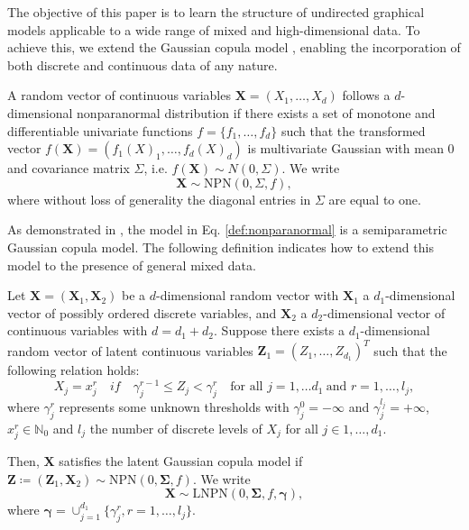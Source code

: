 The objective of this paper is to learn the structure of undirected graphical models applicable to a wide range of mixed and high-dimensional data. To achieve this, we extend the Gaussian copula model \citep{Liu09, Liu12, Xue12}, enabling the incorporation of both discrete and continuous data of any nature.

\begin{definition}
    A random vector of continuous variables \(\mathbf{X} = (X_1, \dots, X_d)\) follows a $d$-dimensional nonparanormal distribution if there exists a set of monotone and differentiable univariate functions $f = \{f_1,\dots, f_d\}$ such that the transformed vector \(f(\mathbf{X}) = (f_1(X)_1, \dots, f_d(X)_d)\) is multivariate Gaussian with mean $0$ and covariance matrix \(\Sigma\), i.e. \(f(\mathbf{X})\sim N(0,\Sigma)\). We write
    \begin{equation}\label{def:nonparanormal}
        \mathbf{X} \sim \text{NPN}(0, \Sigma, f),
    \end{equation}
    where without loss of generality the diagonal entries in \(\Sigma\) are equal to one.
\end{definition}

As demonstrated in \cite{Liu09}, the model in Eq. \eqref{def:nonparanormal} is a semiparametric Gaussian copula model. The following definition indicates how to extend this model to the presence of general mixed data.

\begin{definition}\label{latent_gaussian_cm}
    Let $\mathbf{X} = (\mathbf{X}_1,\mathbf{X}_2)$ be a $d$-dimensional random vector with \(\mathbf{X}_1\) a $d_1$-dimensional vector of possibly ordered discrete variables, and \(\mathbf{X}_2\) a $d_2$-dimensional vector of continuous variables with \(d = d_1 + d_2\). Suppose there exists a $d_1$-dimensional random vector of latent continuous variables $\mathbf{Z}_1 = (Z_1, \dots, Z_{d_1})^T$ such that the following relation holds:
    \begin{equation}\label{latent_ordered}
        X_j = x_j^{r} \quad if \quad \gamma_j^{r-1} \leq Z_j < \gamma_j^r \quad \text{for all } j = 1, \dots d_1 \ \text{and } r = 1, \dots, l_j,
    \end{equation}
    where $\gamma^r_j$ represents some unknown thresholds with $\gamma_j^0 = -\infty$ and $\gamma_j^{l_j} = +\infty$, $x^r_j \in \mathbb{N}_0$ and $l_{j}$ the number of discrete levels of $X_j$ for all $j \in 1, \dots, d_1$.

    Then, $\mathbf{X}$ satisfies the latent Gaussian copula model if $\mathbf{Z} \coloneqq (\mathbf{Z}_1, \mathbf{X}_2) \sim \text{NPN}(0, \mathbf{\Sigma}, f)$. We write
    \begin{equation}
        \mathbf{X} \sim \text{LNPN}(0, \mathbf{\Sigma}, f, \mathbf{\gamma}),
    \end{equation}
    where $\mathbf{\gamma} = \cup_{j=1}^{d_1} \{\gamma_j^r, r = 1, \dots, l_j\}$.
\end{definition}

